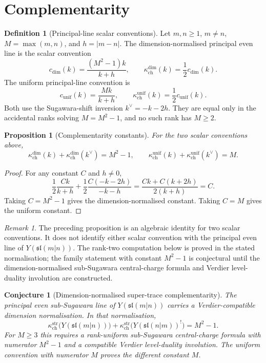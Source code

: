 \documentclass[11pt]{amsart}
\providecommand{\fsl}{\mathfrak{sl}}
\providecommand{\str}{\mathrm{str}}
\newtheorem{proposition}[theorem]{Proposition}
\newtheorem{conjecture}[theorem]{Conjecture}
\theoremstyle{definition}
\newtheorem{definition}[theorem]{Definition}
\theoremstyle{remark}
\newtheorem{remark}[theorem]{Remark}
\begin{document}
\section{Complementarity}

\begin{definition}[Principal-line scalar conventions]
Let \(m,n\geq1\), \(m\neq n\), \(M=\max(m,n)\), and \(h=|m-n|\). The
dimension-normalised principal even line is the scalar convention
\[
        c_{\dim}(k)=\frac{(M^2-1)k}{k+h},
        \qquad
        \kappa_{\mathrm{ch}}^{\dim}(k)=\frac12c_{\dim}(k).
\]
The uniform principal-line convention is
\[
        c_{\mathrm{unif}}(k)=\frac{Mk}{k+h},
        \qquad
        \kappa_{\mathrm{ch}}^{\mathrm{unif}}(k)
        =\frac12c_{\mathrm{unif}}(k).
\]
Both use the Sugawara-shift inversion \(k^\vee=-k-2h\). They are equal
only in the accidental ranks solving \(M=M^2-1\), and no such rank has
\(M\geq2\).
\end{definition}

\begin{proposition}[Complementarity constants]
For the two scalar conventions above,
\[
\kappa_{\mathrm{ch}}^{\dim}(k)
+
\kappa_{\mathrm{ch}}^{\dim}(k^\vee)
=M^2-1,
\qquad
\kappa_{\mathrm{ch}}^{\mathrm{unif}}(k)
+
\kappa_{\mathrm{ch}}^{\mathrm{unif}}(k^\vee)
=M .
\]
\end{proposition}

\begin{proof}
For any constant \(C\) and \(h\neq0\),
\[
        \frac12\frac{Ck}{k+h}
        +
        \frac12\frac{C(-k-2h)}{-k-h}
        =
        \frac{Ck+C(k+2h)}{2(k+h)}
        =
        C .
\]
Taking \(C=M^2-1\) gives the dimension-normalised constant. Taking
\(C=M\) gives the uniform constant.
\end{proof}

\begin{remark}
The preceding proposition is an algebraic identity for two scalar
conventions. It does not identify either scalar convention with the
principal even line of \(Y(\fsl(m|n))\). The rank-two computation below is
proved in the stated normalisation; the family statement with constant
\(M^2-1\) is conjectural until the dimension-normalised sub-Sugawara
central-charge formula and Verdier level-duality involution are
constructed.
\end{remark}

\begin{conjecture}[Dimension-normalised super-trace complementarity]
The principal even sub-Sugawara line of \(Y(\fsl(m|n))\) carries a
Verdier-compatible dimension normalisation. In that normalisation,
\[
\kappa_{\mathrm{ch}}^{\str}\bigl(Y(\fsl(m|n))\bigr)
+
\kappa_{\mathrm{ch}}^{\str}\bigl(Y(\fsl(n|m))^!\bigr)
=M^2-1 .
\]
For \(M\geq3\) this requires a rank-uniform sub-Sugawara central-charge
formula with numerator \(M^2-1\) and a compatible Verdier level-duality
involution. The uniform convention with numerator \(M\) proves the
different constant \(M\).
\end{conjecture}
\end{document}
